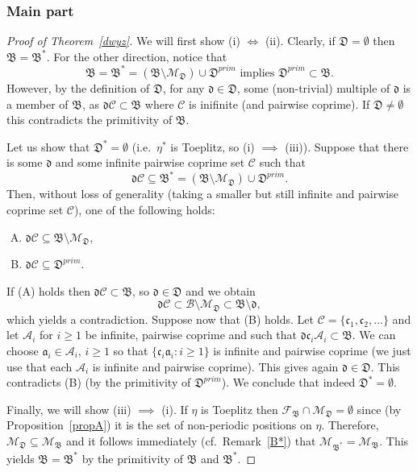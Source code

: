 \documentclass[leqno,a4paper,12pt]{article}
\theoremstyle{definition}
\newcommand{\cC}{\mathcal{C}}
\begin{document}
\subsubsection{Main part}
\begin{proof}[Proof of Theorem~\ref{dwyz}]
We will first show (i) $\iff$ (ii). Clearly, if $\mathfrak{D}=\emptyset$ then $\mathfrak{B}=\mathfrak{B}^*$. For the other direction, notice that
\[
\mathfrak{B}=\mathfrak{B}^*=(\mathfrak{B}\setminus \mathcal{M}_\mathfrak{D})\cup \mathfrak{D}^{prim} \text{ implies }\mathfrak{D}^{prim}\subset \mathfrak{B}.
\]
However, by the definition of $\mathfrak{D}$, for any $\mathfrak{d}\in\mathfrak{D}$, some (non-trivial) multiple of $\mathfrak{d}$ is a member of $\mathfrak{B}$, as $\mathfrak{d}\mathcal{C}\subset \mathfrak{B}$ where $\mathcal{C}$ is inifinite (and pairwise coprime). If $\mathfrak{D}\neq\emptyset$ this contradicts the primitivity of $\mathfrak{B}$.


Let us show that $\mathfrak{D}^*=\emptyset$ (i.e.\ $\eta^*$ is Toeplitz, so (i) $\implies$ (iii)). Suppose that there is some $\mathfrak{d}$ and some infinite pairwise coprime set $\cC$ such that
\[
\mathfrak{d}\mathcal{C}\subseteq \mathfrak{B}^*=(\mathfrak{B}\setminus \mathcal{M}_\mathfrak{D})\cup \mathfrak{D}^{prim}.
\]
Then, without loss of generality (taking a smaller but still infinite and pairwise coprime set $\cC$), one of the following holds:
\begin{enumerate}[(A)]
\item
$\mathfrak{d}\mathcal{C}\subseteq \mathfrak{B}\setminus \mathcal{M}_\mathfrak{D}$,
\item
$\mathfrak{d}\mathcal{C}\subseteq \mathfrak{D}^{prim}$.
\end{enumerate}
If (A) holds then $\mathfrak{d}\mathcal{C}\subset \mathfrak{B}$, so $\mathfrak{d}\in \mathfrak{D}$ and we obtain
\[
\mathfrak{d}\mathcal{C}\subset \mathscr{B}\setminus \mathcal{M}_\mathfrak{D}\subset \mathfrak{B}\setminus \mathfrak{d},
\]
which yields a contradiction. Suppose now that (B) holds. Let $\mathcal{C}=\{\mathfrak{c}_1,\mathfrak{c}_2,\dots\}$ and let $\mathcal{A}_i$ for $i\geq 1$ be infinite, pairwise coprime and such that $\mathfrak{d}\mathfrak{c}_i\mathcal{A}_i\subset \mathfrak{B}$. We can choose $\mathfrak{a}_i\in\mathcal{A}_i$, $i\geq 1$ so that $\{\mathfrak{c}_i\mathfrak{a}_i:i\geq 1\}$ is infinite and pairwise coprime (we just use that each $\mathcal{A}_i$ is infinite and pairwise coprime). This gives again $\mathfrak{d}\in \mathfrak{D}$. This contradicts (B) (by the primitivity of $\mathfrak{D}^{prim}$). We conclude that indeed $\mathfrak{D}^*=\emptyset$.


Finally, we will show (iii) $\implies$ (i). If $\eta$ is Toeplitz then $\mathcal{F}_\mathfrak{B}\cap \mathcal{M}_\mathfrak{D}=\emptyset$ since (by Proposition~\ref{propA}) it is the set of non-periodic positions on $\eta$. Therefore, $\mathcal{M}_\mathfrak{D}\subseteq \mathcal{M}_\mathfrak{B}$ and it follows immediately (cf.\ Remark~\ref{B*}) that $\mathcal{M}_{\mathfrak{B}^*}=\mathcal{M}_{\mathfrak{B}}$. This yields $\mathfrak{B}=\mathfrak{B}^*$ by the primitivity of $\mathfrak{B}$ and $\mathfrak{B}^*$.
\end{proof}
\end{document}
